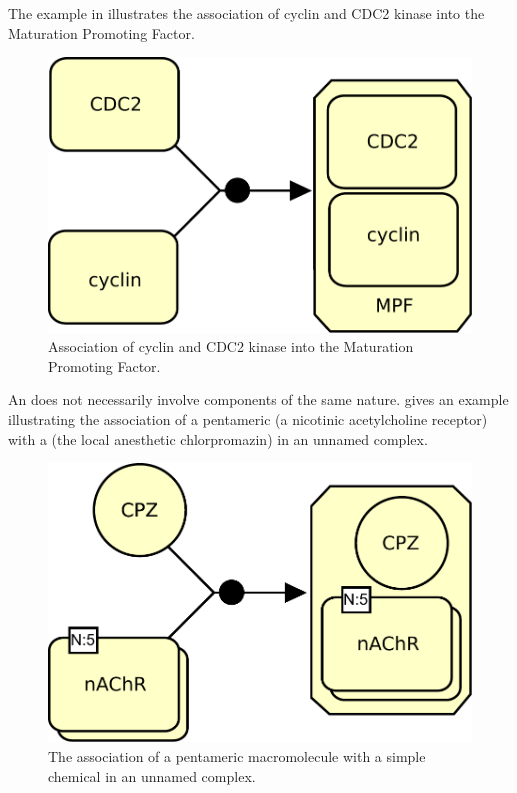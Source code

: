 The example in  illustrates the association of cyclin and CDC2 kinase into the Maturation Promoting Factor.

\begin{figure}[htb]
  \centering
  \includegraphics[scale = 0.5]{le_images/association-MPF}
  \caption{Association of cyclin and CDC2 kinase into the Maturation Promoting Factor.}
  \label{fig:assoc-cyclin}
\end{figure}

An  does not necessarily involve components of the same nature.  gives an example illustrating the association of a pentameric  (a nicotinic acetylcholine receptor) with a  (the local anesthetic chlorpromazin) in an unnamed complex.

\begin{figure}[htb]
  \centering
  \includegraphics[scale = 0.5]{le_images/association-unamed}
  \caption{The association of a pentameric macromolecule with a simple chemical in an unnamed complex.}
  \label{fig:assoc-unamed}
\end{figure}

